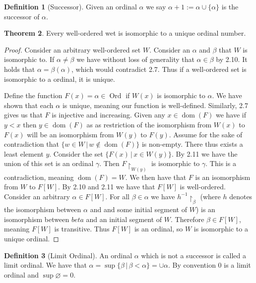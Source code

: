 \documentclass{article}
\theoremstyle{definition}
\newtheorem{thm}{Theorem}[section]
\newtheorem{defn}[thm]{Definition}
\newcommand*{\mtset}{\ensuremath{\varnothing}}
\DeclareMathOperator{\dom}{dom}
\DeclareMathOperator{\Ord}{Ord}
\begin{document}
\begin{defn}[Successor]
    Given an ordinal $\alpha$ we say $\alpha + 1 := \alpha \cup \{\alpha\}$ is the successor of $\alpha$.
\end{defn}

\begin{thm}
    Every well-ordered wet is isomorphic to a unique ordinal number.
\end{thm}

\begin{proof}
    Consider an arbitrary well-ordered set $W$. Consider an $\alpha$ and $\beta$ that $W$ is isomorphic to. If $\alpha \ne \beta$ we have without loss of generality that $\alpha \in \beta$ by 2.10. It holds that $\alpha = \beta(\alpha)$, which would contradict 2.7. Thus if a well-ordered set is isomorphic to a ordinal, it is unique.

    Define the function $F(x) = \alpha \in \Ord$ if $W(x)$ is isomorphic to $\alpha$. We have shown that each $\alpha$ is unique, meaning our function is well-defined. Similarly, 2.7 gives us that $F$ is injective and increasing. Given any $x \in \dom(F)$ we have if $y < x$ then $y \in \dom(F)$ as as restriction of the isomorphism from $W(x)$ to $F(x)$ will be an isomorphism from $W(y)$ to $F(y)$. Assume for the sake of contradiction that $\{w \in W \, | \, w \not\in \dom(F) \}$ is non-empty. There thus exists a least element $y$. Consider the set $\{F(x) \, | \, x \in W(y)\}$. By 2.11 we have the union of this set is an ordinal $\gamma$. Then $F\restriction_{W(y)}$ is isomorphic to $\gamma$. This is a contradiction, meaning $\dom(F) = W$. We then have that $F$ is an isomorphism from $W$ to $F[W]$. By 2.10 and 2.11 we have that $F[W]$ is well-ordered. Consider an arbitrary $\alpha \in F[W]$. For all $\beta \in \alpha$ we have $h^{-1}\restriction_{\beta}$ (where $h$ denotes the isomorphism between $\alpha$ and and some initial segment of $W$) is an isomorphism between $beta$ and an initial segment of $W$. Therefore $\beta \in F[W]$, meaning $F[W]$ is transitive. Thus $F[W]$ is an ordinal, so $W$ is isomorphic to a unique ordinal.
\end{proof}

\begin{defn}[Limit Ordinal]
    An ordinal $\alpha$ which is not a successor is called a limit ordinal. We have that $\alpha = \sup \{\beta \, | \, \beta < \alpha\} = \cup \alpha$. By convention $0$ is a limit ordinal and $\sup \mtset = 0$.
\end{defn}
\end{document}
